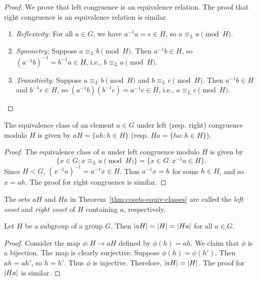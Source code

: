 \begin{proof}
    We prove that left congruence is an equivalence relation. The proof that
    right congruence is an equivalence relation is similar.

    \begin{enumerate}
        \item \emph{Reflexivity:} For all \(a \in G\), we have \(a^{-1}a = e \in
        H\), so \(a \equiv_L a \pmod{H}\).
        \item \emph{Symmetry:} Suppose \(a \equiv_L b \pmod{H}\). Then \(a^{-1}b
        \in H\), so \((a^{-1}b)^{-1} = b^{-1}a \in H\), i.e., \(b \equiv_L a
        \pmod{H}\).
        \item \emph{Transitivity:} Suppose \(a \equiv_L b \pmod{H}\) and \(b
        \equiv_L c \pmod{H}\). Then \(a^{-1}b \in H\) and \(b^{-1}c \in H\), so
        \((a^{-1}b)(b^{-1}c) = a^{-1}c \in H\), i.e., \(a \equiv_L c \pmod{H}\).
    \end{enumerate}
\end{proof}

\begin{theorem}
    \label{thm:cosets-equiv-classes}
    The equivalence class of an element \(a \in G\) under left (resp. right)
    congruence modulo \(H\) is given by \(aH = \{ah : h \in H\}\) (resp. \(Ha =
    \{ha : h \in H\}\)).
\end{theorem}

\begin{proof}
    The equivalence class of \(a\) under left congruence modulo \(H\) is given
    by
    \[
        \{ x \in G : x \equiv_L a \pmod{H} \} = \{ x \in G : x^{-1}a \in H \}.
    \]
    Since \(H < G\), \((x^{-1}a)^{-1} = a^{-1}x \in H\). Thus \(a^{-1}x = h\)
    for some \(h \in H\), and so \(x = ah\). The proof for right congruence is
    similar.
\end{proof}

\begin{definition}
    The sets \(aH\) and \(Ha\) in Theorem~\ref{thm:cosets-equiv-classes} are
    called the \emph{left coset} and \emph{right coset} of \(H\) containing
    \(a\), respectively.
\end{definition}

\begin{theorem}
    Let \(H\) be a subgroup of a group \(G\). Then \(\lvert aH \rvert = \lvert H \rvert =
    \lvert Ha \rvert\) for all \(a \in G\).
\end{theorem}

\begin{proof}
    Consider the map \(\phi: H \to aH\) defined by \(\phi(h) = ah\). We claim
    that \(\phi\) is a bijection. The map is clearly surjective. Suppose
    \(\phi(h) = \phi(h')\). Then \(ah = ah'\), so \(h = h'\). Thus \(\phi\) is
    injective. Therefore, \(\lvert aH \rvert = \lvert H \rvert\). The proof for
    \(\lvert Ha \rvert\) is similar.
\end{proof}

